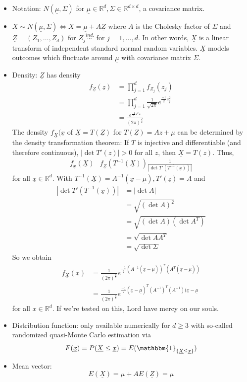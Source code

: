 \documentclass{article}
\newcommand{\R}{\mathbb{R}}
\newcommand{\inv}{^{-1}}
\begin{document}
			\begin{itemize}
						\item Notation: $N(\underline{\mu}, \Sigma)$ for $\underline{\mu}\in\R^d, \Sigma\in\R^{d\times d}$, a covariance matrix.
						\item $X\sim N(\underline{\mu}, \Sigma)\Leftrightarrow X=\underline{\mu}+A\underline{Z}$ where $A$ is the Cholesky factor of $\Sigma$ and $\underline{Z}=(Z_1, \dots, Z_d)$ for $Z_j\stackrel{ind.}{\sim}$ for $j=1, \dots, d$. In other words, $\underline{X}$ is a linear transform of independent standard normal random variables. $\underline{X}$ models outcomes which fluctuate around $\underline{\mu}$ with covariance matrix $\Sigma$.
						\item Density: $\underline{Z}$ has density 
						\begin{align*}
							f_{\underline{Z}}(\underline{z})&=\prod_{j=1}^df_{Z_j}(z_j)\\
							&=\prod_{j=1}^d\frac{1}{\sqrt{2\pi}}e^{\frac{-1}{2}z_j^2}\\
							&=\frac{e^{\frac{-1}{2}z^Tz}}{(2\pi)^{\frac{d}{2}}}
						\end{align*}
						The density $f_{\underline{X}}(\underline{x}$ of $\underline{X}=T(\underline{Z})$ for $T(\underline{Z})=Az+\mu$ can be determined by the density transformation theorem: If $T$ is injective and differentiable (and therefore continuous), $|\det T'(z)|>0$ for all $z$, then $\underline{X}=T(z)$. Thus,
						\begin{align*}
							f_{\underline{x}}(\underline{X})&f_{\underline{Z}}(T\inv(\underline{X}))\frac{1}{|\det T'(T\inv(\underline{x}))|}
						\end{align*}
						for all $\underline{x}\in\R^d$. With $T\inv(\underline{X})=A\inv(\underline{x}-\underline{\mu}), T'(\underline{z})=A$ and
						\begin{align*}
							|\det T'(T\inv(\underline{x}))|&=|\det A|\\
							&=\sqrt{(\det A)^2}\\
							&=\sqrt{(\det A)(\det A^T)}\\
							&=\sqrt{\det AA^T}\\
							&=\sqrt{\det \Sigma}
						\end{align*}
						So we obtain
						\begin{align*}
							f_{\underline{X}}(\underline{x})&=\frac{1}{(2\pi)^{\frac{d}{2}}}e^{\frac{-1}{2}(A\inv(\underline{x}-\underline{\mu}))^T(A^T(\underline{x}-\underline{\mu}))}\\
							&=\frac{1}{(2\pi)^{\frac{d}{2}}}e^{\frac{-1}{2}(\underline{x}-\underline{\mu})^T(A\inv)^T(A\inv)(\underline{x}-\underline{\mu}}						\end{align*}
							for all $x\in\R^d$. If we're tested on this, Lord have mercy on our souls.
						\item Distribution function: only available numerically for $d\geq3$ with so-called randomized quasi-Monte Carlo estimation via $$F(\underline{x})=P(\underline{X}\leq\underline{x})=E(\mathbbm{1}_{\{\underline{X}\leq\underline{x}\}})$$
						\item Mean vector:
						$$E(\underline{X})=\mu+AE(\underline{Z})=\mu$$
						

\end{itemize}
\end{document}
